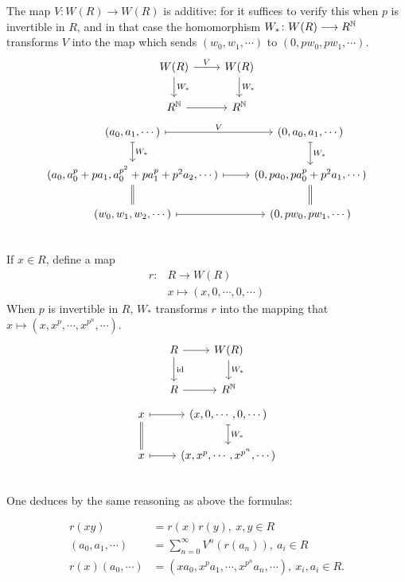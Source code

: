 The  map $V\colon  W(R)\longrightarrow W(R)$  is  additive: for it suffices to verify this when  $p$ is  invertible in  $R$,  and  in  that  case the homomorphism
$W_*\colon W(R)\longrightarrow R^{\mathbb{N}}$ transforms $V$ into the map which sends $(w_0,w_1,\cdots)$ to $(0,pw_0,pw_1,\cdots)$.
\[
\begin{tikzcd}
	W(R) \arrow[r,"V"] \arrow[d,"W_*"] & W(R) \arrow[d,"W_*"]\\
	R^\N \arrow[r]  & R^\N
\end{tikzcd}
\]
\[
\begin{tikzcd}
	(a_0,a_1,\cdots) \arrow[r,mapsto,"V"] \arrow[d,mapsto,"W_*"] & (0,a_0,a_1,\cdots) \arrow[d,mapsto,"W_*"]\\
	(a_0,a_0^p+pa_1,a_0^{p^2}+pa_1^p+p^2a_2,\cdots) \arrow[r,mapsto] \arrow[d,equal] & (0,pa_0,pa_0^p+p^2a_1,\cdots)\arrow[d,equal]\\
	(w_0,w_1,w_2,\cdots) \arrow[r,mapsto]& (0,pw_0,pw_1,\cdots)\\
\end{tikzcd}
\]
If $x\in R$, define a map
\begin{align*}
r\colon & R\longrightarrow W(R)\\
& x\mapsto (x,0,\cdots,0,\cdots)
\end{align*}
When $p$ is invertible in $R$, $W_*$ transforms $r$
into the mapping that $x \mapsto (x, x^p, \cdots , x^{p^n}, \cdots )$. 
\[
\begin{tikzcd}
	R \arrow[r] \arrow[d,"\id"] & W(R) \arrow[d,"W_*"]\\
	R \arrow[r]  & R^\N
\end{tikzcd}
\]
\[
\begin{tikzcd}
	x \arrow[r,mapsto] \arrow[d,equal] & (x,0,\cdots,0,\cdots) \arrow[d,mapsto,"W_*"]\\
	x\arrow[r,mapsto] & (x,x^p,\cdots,x^{p^n},\cdots)\\
\end{tikzcd}
\]
One deduces by the same reasoning as above the  formulas:
\begin{prop}
	\begin{align*}
	r(xy)&=r(x)r(y),\ x,y\in R\\
	(a_0,a_1,\cdots)&=\sum_{n=0}^\infty V^n(r(a_n)),\ a_i\in R\\
	r(x)(a_0,\cdots)&=(xa_0,x^pa_1,\cdots,x^{p^n}a_n,\cdots),\ x_i,a_i\in R.
	\end{align*}
\end{prop}
